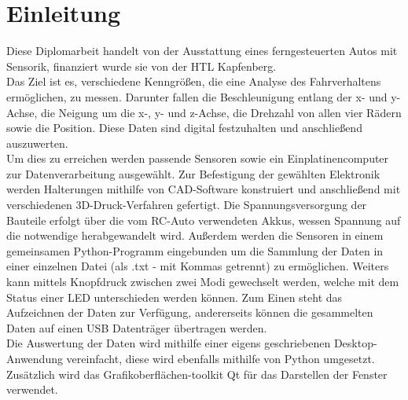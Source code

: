 \section{Einleitung}
\label{sec:einleitung}
Diese Diplomarbeit handelt von der Ausstattung eines ferngesteuerten Autos mit Sensorik, finanziert wurde sie von der HTL Kapfenberg.\\
Das Ziel ist es, verschiedene Kenngrößen, die eine Analyse des Fahrverhaltens ermöglichen, zu messen. Darunter fallen die Beschleunigung entlang der x- und y-Achse, die Neigung um die x-, y- und z-Achse, die Drehzahl von allen vier Rädern sowie die Position. Diese Daten sind digital festzuhalten und anschließend auszuwerten. \\
Um dies zu erreichen werden passende Sensoren sowie ein Einplatinencomputer zur Datenverarbeitung ausgewählt. Zur Befestigung der gewählten Elektronik werden Halterungen mithilfe von \ac{CAD}-Software konstruiert und anschließend mit verschiedenen 3D-Druck-Verfahren gefertigt. Die Spannungsversorgung der Bauteile erfolgt über die vom RC-Auto verwendeten Akkus, wessen Spannung auf die notwendige herabgewandelt wird. Außerdem werden die Sensoren in einem gemeinsamen Python-Programm eingebunden um die Sammlung der Daten in einer einzelnen Datei (als .txt - mit Kommas getrennt) zu ermöglichen. Weiters kann mittels Knopfdruck zwischen zwei Modi gewechselt werden, welche mit dem Status einer \ac{LED} unterschieden werden können. Zum Einen steht das Aufzeichnen der Daten zur Verfügung, andererseits können die gesammelten Daten auf einen \ac{USB} Datenträger übertragen werden. \\
Die Auswertung der Daten wird mithilfe einer eigens geschriebenen Desktop-Anwendung vereinfacht, diese wird ebenfalls mithilfe von Python umgesetzt. Zusätzlich wird das Grafikoberflächen-toolkit Qt für das Darstellen der Fenster verwendet.